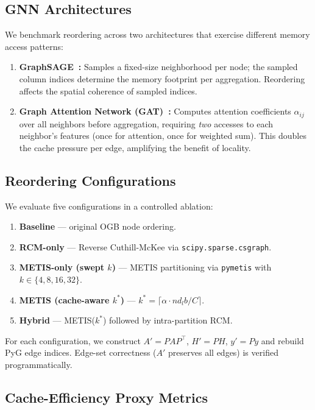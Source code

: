 \documentclass[sigconf,review]{acmart}
\begin{document}
\subsection{GNN Architectures}
We benchmark reordering across two architectures that exercise different memory access patterns:
\begin{enumerate}
    \item \textbf{GraphSAGE~\cite{hamilton2017sage}:} Samples a fixed-size neighborhood per node; the sampled column indices determine the memory footprint per aggregation. Reordering affects the spatial coherence of sampled indices.
    \item \textbf{Graph Attention Network (GAT)~\cite{velickovic2018gat}:} Computes attention coefficients $\alpha_{ij}$ over all neighbors before aggregation, requiring \emph{two} accesses to each neighbor's features (once for attention, once for weighted sum). This doubles the cache pressure per edge, amplifying the benefit of locality.
\end{enumerate}

\subsection{Reordering Configurations}
We evaluate five configurations in a controlled ablation:
\begin{enumerate}[noitemsep]
    \item \textbf{Baseline} --- original OGB node ordering.
    \item \textbf{RCM-only} --- Reverse Cuthill-McKee via \texttt{scipy.sparse.csgraph}.
    \item \textbf{METIS-only (swept $k$)} --- METIS partitioning via \texttt{pymetis} with $k \in \{4, 8, 16, 32\}$.
    \item \textbf{METIS (cache-aware $k^*$)} --- $k^* = \lceil \alpha \cdot n d_l b / C \rceil$.
    \item \textbf{Hybrid} --- METIS($k^*$) followed by intra-partition RCM.
\end{enumerate}
For each configuration, we construct $A' = PAP^\top$, $H'=PH$, $y'=Py$ and rebuild PyG edge indices. Edge-set correctness ($A'$ preserves all edges) is verified programmatically.

\subsection{Cache-Efficiency Proxy Metrics}
\label{sec:proxies}
\end{document}
